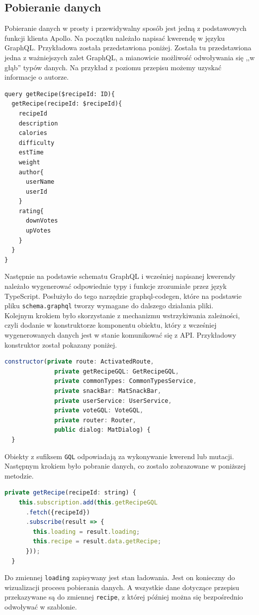 \subsection{Pobieranie danych}
Pobieranie danych w prosty i przewidywalny sposób jest jedną z podstawowych funkcji klienta Apollo.
Na początku należało napisać kwerendę w języku GraphQL. Przykładowa została przedstawiona poniżej. Została tu przedstawiona jedna z ważniejszych zalet GraphQL, a mianowicie możliwość odwoływania się ,,w głąb'' typów danych. Na przykład z poziomu przepisu możemy uzyskać informacje o autorze.
\begin{lstlisting}
query getRecipe($recipeId: ID){
  getRecipe(recipeId: $recipeId){
    recipeId
    description
    calories
    difficulty
    estTime
    weight
    author{
      userName
      userId
    }
    rating{
      downVotes
      upVotes
    }
  }
}
\end{lstlisting}
Następnie na podstawie schematu GraphQL i wcześniej napisanej kwerendy należało wygenerować odpowiednie typy i funkcje zrozumiałe przez język TypeScript. Posłużyło do tego narzędzie graphql-codegen, które na podstawie pliku \texttt{schema.graphql} tworzy wymagane do dalszego działania pliki.\\
Kolejnym krokiem było skorzystanie z mechanizmu wstrzykiwania zależności, czyli dodanie w konstruktorze komponentu obiektu, który z wcześniej wygenerowanych danych jest w stanie komunikować się z API. Przykładowy konstruktor został pokazany poniżej.
\begin{lstlisting}[language=JavaScript]
  constructor(private route: ActivatedRoute,
              private getRecipeGQL: GetRecipeGQL,
              private commonTypes: CommonTypesService,
              private snackBar: MatSnackBar,
              private userService: UserService,
              private voteGQL: VoteGQL,
              private router: Router,
              public dialog: MatDialog) {
  }
\end{lstlisting}
Obiekty z sufiksem \texttt{GQL} odpowiadają za wykonywanie kwerend lub mutacji.\\
Następnym krokiem było pobranie danych, co zostało zobrazowane w poniższej metodzie.
\begin{lstlisting}[language=JavaScript]
  private getRecipe(recipeId: string) {
    this.subscription.add(this.getRecipeGQL
      .fetch({recipeId})
      .subscribe(result => {
        this.loading = result.loading;
        this.recipe = result.data.getRecipe;
      }));
  }
  \end{lstlisting}
  Do zmiennej \texttt{loading} zapisywany jest stan ładowania. Jest on konieczny do wizualizacji procesu pobierania danych. A wszystkie dane dotyczące przepisu przekazywane są do zmiennej \texttt{recipe}, z której później można się bezpośrednio odwoływać w szablonie.
